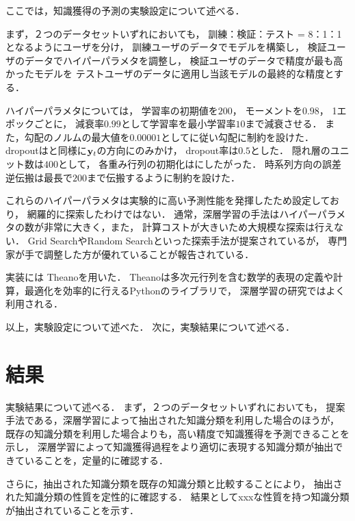ここでは，知識獲得の予測の実験設定について述べる．

まず，２つのデータセットいずれにおいても，
訓練：検証：テスト = 8：1：1となるようにユーザを分け，
訓練ユーザのデータでモデルを構築し，
検証ユーザのデータでハイパーパラメタを調整し， 
検証ユーザのデータで精度が最も高かったモデルを
テストユーザのデータに適用し当該モデルの最終的な精度とする．


ハイパーパラメタについては，
学習率の初期値を$200$，
モーメントを$0.98$，
1エポックごとに，
減衰率$0.99$として学習率を最小学習率$10$まで減衰させる．
また，勾配のノルムの最大値を$0.00001$として\cite{pascanu2013difficulty}に従い勾配に制約を設けた．
dropoutは\cite{piech2015deep}と同様に${\bf y}_t$の方向にのみかけ，
dropout率は$0.5$とした．
隠れ層のユニット数は$400$として，
各重み行列の初期化は\cite{glorot2010understanding}にしたがった．
時系列方向の誤差逆伝搬は最長で$200$まで伝搬するように制約を設けた．

これらのハイパーパラメタは実験的に高い予測性能を発揮したため設定しており，
網羅的に探索したわけではない．
通常，深層学習の手法はハイパーパラメタの数が非常に大きく，また，
計算コストが大きいため大規模な探索は行えない．
Grid SearchやRandom Search\cite{bergstra2012random}といった探索手法が提案されているが，
専門家が手で調整した方が優れていることが報告されている\cite{larochelle2007empirical, bergstra2012random}．


実装には
Theanoを用いた\cite{bergstra+al:2010-scipy,Bastien-Theano-2012}．
Theanoは多次元行列を含む数学的表現の定義や計算，最適化を効率的に行えるPythonのライブラリで，
深層学習の研究ではよく利用される．



以上，実験設定について述べた．
次に，実験結果について述べる．



\section{結果}
実験結果について述べる．
まず，２つのデータセットいずれにおいても，
提案手法である，深層学習によって抽出された知識分類を利用した場合のほうが，
既存の知識分類を利用した場合よりも，高い精度で知識獲得を予測できることを示し，
深層学習によって知識獲得過程をより適切に表現する知識分類が抽出できていることを，定量的に確認する．

さらに，抽出された知識分類を既存の知識分類と比較することにより，
抽出された知識分類の性質を定性的に確認する．
結果としてxxxな性質を持つ知識分類が抽出されていることを示す．



